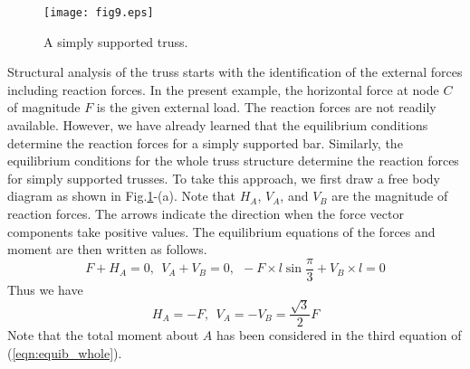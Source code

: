 ﻿\documentclass[10pt,a4j]{article}
\begin{document}
\begin{figure}[h]
	\begin{center}
	\texttt{[image: fig9.eps]} 
	\end{center}
	\caption{A simply supported truss.} 
	\label{fig:fig9}
\end{figure}
Structural analysis of the truss starts with the identification of the external forces including reaction forces. 
In the present example, the horizontal force at node $C$ of magnitude $F$ is the given external load. 
The reaction forces are not readily available. However, we have already learned that the equilibrium conditions determine the reaction forces for a simply supported bar. 
Similarly, the equilibrium conditions for the whole truss structure determine the reaction forces for simply supported trusses. 
To take this approach, we first draw a free body diagram as shown in Fig.\ref{fig:fig9}-(a). 
Note that $H_A$, $V_A$, and $V_B$ are the magnitude of reaction forces. 
The arrows indicate the direction when the force vector components take positive values. 
The equilibrium equations of the forces and moment are then written as follows.
\begin{equation}
	F+H_A=0, \ \ V_A+V_B=0, \ \ -F\times l\sin\frac{\pi}{3}+V_B\times l=0 
	\label{eqn:equib_whole}
\end{equation}
Thus we have 
\begin{equation}
	H_A=-F, \ \ V_A=-V_B=\frac{\sqrt{3}}{2}F
	\label{eqn:reac_frc}
\end{equation}
Note that the total moment about $A$ has been considered in the third equation of (\ref{eqn:equib_whole}).
\end{document}
